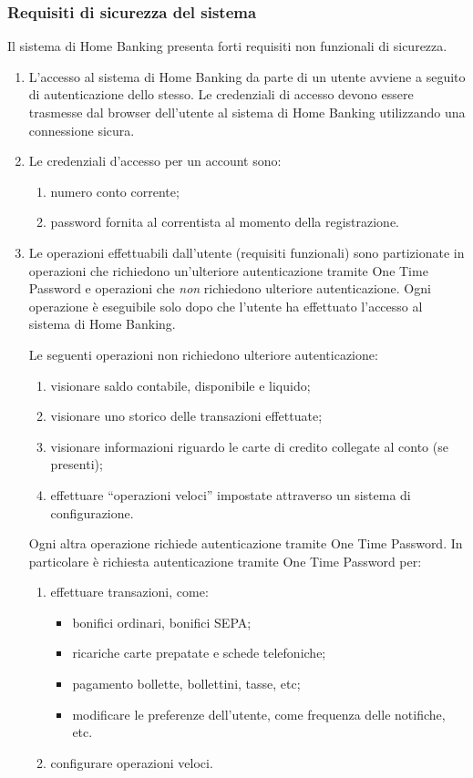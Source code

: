 \subsubsection{Requisiti di sicurezza del sistema}

Il sistema di Home Banking presenta forti requisiti non funzionali di sicurezza.

\begin{enumerate}
	\item L'accesso al sistema di Home Banking da parte di un utente avviene a seguito di autenticazione dello stesso.
		Le credenziali di accesso devono essere trasmesse dal browser dell'utente al sistema di Home Banking utilizzando una connessione sicura.
	\item Le credenziali d'accesso per un account sono:
		\begin{enumerate}
			\item numero conto corrente;
			\item password fornita al correntista al momento della registrazione.
		\end{enumerate}
	\item Le operazioni effettuabili dall'utente (requisiti funzionali) sono partizionate in operazioni che richiedono un'ulteriore autenticazione tramite One Time Password e operazioni che \emph{non} richiedono ulteriore autenticazione.
	Ogni operazione \`e eseguibile solo dopo che l'utente ha effettuato l'accesso al sistema di Home Banking.

	Le seguenti operazioni non richiedono ulteriore autenticazione:
	\begin{enumerate}
		\item visionare saldo contabile, disponibile e liquido;
		\item visionare uno storico delle transazioni effettuate;
		\item visionare informazioni riguardo le carte di credito collegate al conto (se presenti);
		\item effettuare ``operazioni veloci'' impostate attraverso un sistema di configurazione.
	\end{enumerate}
	
	Ogni altra operazione richiede autenticazione tramite One Time Password.
	In particolare \`e richiesta autenticazione tramite One Time Password per:
	\begin{enumerate}
		\item effettuare transazioni, come:
		\begin{itemize}
			\item bonifici ordinari, bonifici SEPA;
			\item ricariche carte prepatate e schede telefoniche;
			\item pagamento bollette, bollettini, tasse, etc;
			\item modificare le preferenze dell'utente, come frequenza delle notifiche, etc.
		\end{itemize}
		\item configurare operazioni veloci.
	\end{enumerate}
\end{enumerate}

